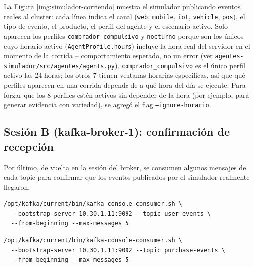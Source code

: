 La Figura \ref{img:simulador-corriendo} muestra el simulador publicando eventos reales al cluster: cada línea indica el canal (\texttt{web}, \texttt{mobile}, \texttt{iot}, \texttt{vehicle}, \texttt{pos}), el tipo de evento, el producto, el perfil del agente y el escenario activo. Solo aparecen los perfiles \texttt{comprador\_compulsivo} y \texttt{nocturno} porque son los únicos cuyo horario activo (\texttt{AgentProfile.hours}) incluye la hora real del servidor en el momento de la corrida -- comportamiento esperado, no un error (ver \texttt{agentes-simulador/src/agentes/agents.py}). \texttt{comprador\_compulsivo} es el único perfil activo las 24 horas; los otros 7 tienen ventanas horarias específicas, así que qué perfiles aparecen en una corrida depende de a qué hora del día se ejecute. Para forzar que los 8 perfiles estén activos sin depender de la hora (por ejemplo, para generar evidencia con variedad), se agregó el flag \texttt{--ignore-horario}.


\subsection{Sesión B (kafka-broker-1): confirmación de recepción}

Por último, de vuelta en la sesión del broker, se consumen algunos mensajes de cada topic para confirmar que los eventos publicados por el simulador realmente llegaron:

\begin{lstlisting}[style=cmdbox]
/opt/kafka/current/bin/kafka-console-consumer.sh \
  --bootstrap-server 10.30.1.11:9092 --topic user-events \
  --from-beginning --max-messages 5
\end{lstlisting}


\begin{lstlisting}[style=cmdbox]
/opt/kafka/current/bin/kafka-console-consumer.sh \
  --bootstrap-server 10.30.1.11:9092 --topic purchase-events \
  --from-beginning --max-messages 5
\end{lstlisting}


